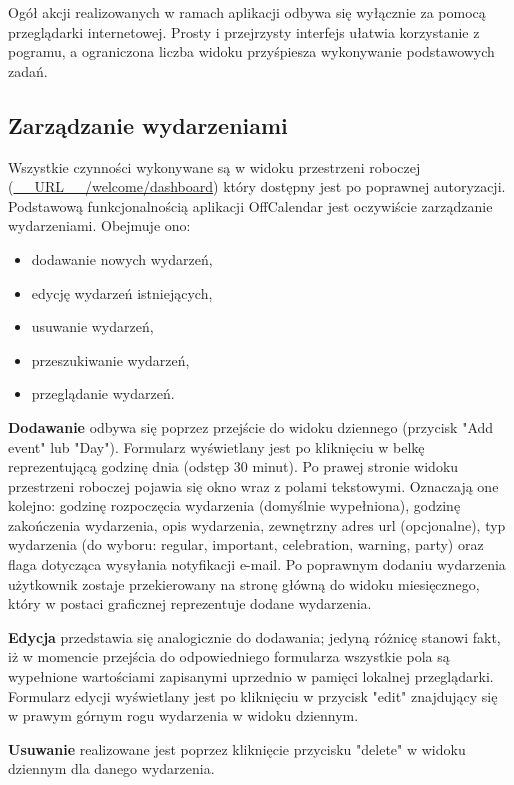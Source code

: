Ogół akcji realizowanych w ramach aplikacji odbywa się wyłącznie za pomocą przeglądarki internetowej. Prosty i przejrzysty interfejs ułatwia korzystanie z pogramu, a ograniczona liczba widoku przyśpiesza wykonywanie podstawowych zadań.

\subsection{Zarządzanie wydarzeniami}
\label{sec:instrZarzWyd}

Wszystkie czynności wykonywane są w widoku przestrzeni roboczej (\url{__URL__/welcome/dashboard}) który dostępny jest po poprawnej autoryzacji. Podstawową funkcjonalnością aplikacji OffCalendar jest oczywiście zarządzanie wydarzeniami. Obejmuje ono:

\begin{itemize}
\item dodawanie nowych wydarzeń,
\item edycję wydarzeń istniejących,
\item usuwanie wydarzeń,
\item przeszukiwanie wydarzeń,
\item przeglądanie wydarzeń.
\end{itemize}

\textbf{Dodawanie} odbywa się poprzez przejście do widoku dziennego (przycisk "Add event" lub "Day"). Formularz wyświetlany jest po kliknięciu w belkę reprezentującą godzinę dnia (odstęp 30 minut). Po prawej stronie widoku przestrzeni roboczej pojawia się okno wraz z polami tekstowymi. Oznaczają one kolejno: godzinę rozpoczęcia wydarzenia (domyślnie wypełniona), godzinę zakończenia wydarzenia, opis wydarzenia, zewnętrzny adres url (opcjonalne), typ wydarzenia (do wyboru: regular, important, celebration, warning, party) oraz flaga dotycząca wysyłania notyfikacji e-mail. Po poprawnym dodaniu wydarzenia użytkownik zostaje przekierowany na stronę główną do widoku miesięcznego, który w postaci graficznej reprezentuje dodane wydarzenia.

\textbf{Edycja} przedstawia się analogicznie do dodawania; jedyną różnicę stanowi fakt, iż w momencie przejścia do odpowiedniego formularza wszystkie pola są wypełnione wartościami zapisanymi uprzednio w pamięci lokalnej przeglądarki. Formularz edycji wyświetlany jest po kliknięciu w przycisk "edit" znajdujący się w prawym górnym rogu wydarzenia w widoku dziennym.

\textbf{Usuwanie} realizowane jest poprzez kliknięcie przycisku "delete" w widoku dziennym dla danego wydarzenia.

